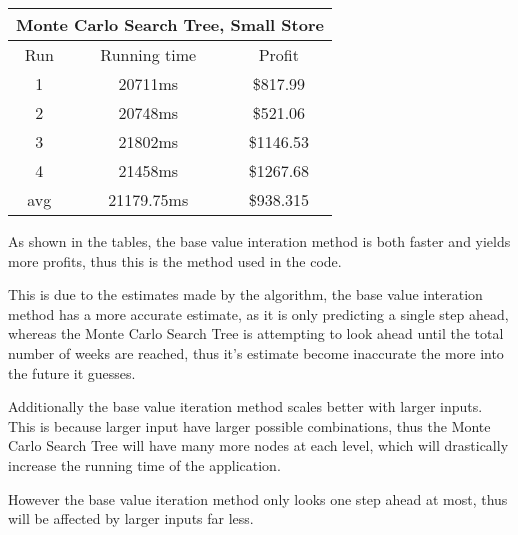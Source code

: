 \documentclass[12pt]{article}
\begin{document}
    \begin{center}
        \begin{tabular}{ |c|c|c| }
            \hline
            \multicolumn{3}{|c|}{Monte Carlo Search Tree, Small Store} \\
            \hline
            Run & Running time & Profit \\
            \hline
            1 & 20711ms & \$817.99\\
            2 & 20748ms & \$521.06\\
            3 & 21802ms & \$1146.53\\
            4 & 21458ms & \$1267.68\\
            \hline
            avg & 21179.75ms & \$938.315\\
            \hline
        \end{tabular}
    \end{center}

    As shown in the tables, the base value interation method is both faster and yields more profits, thus this is the method used in the code. 

    This is due to the estimates made by the algorithm, the base value interation method has a more accurate estimate, as it is only predicting a single step ahead, whereas the Monte Carlo Search Tree is attempting to look ahead until the total number of weeks are reached, thus it's estimate become inaccurate the more into the future it guesses.

    Additionally the base value iteration method scales better with larger inputs. This is because larger input have larger possible combinations, thus the Monte Carlo Search Tree will have many more nodes at each level, which will drastically increase the running time of the application.

    However the base value iteration method only looks one step ahead at most, thus will be affected by larger inputs far less.
\end{document}

